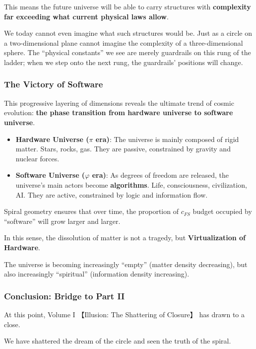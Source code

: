 This means the future universe will be able to carry structures with \textbf{complexity far exceeding what current physical laws allow}.

We today cannot even imagine what such structures would be. Just as a circle on a two-dimensional plane cannot imagine the complexity of a three-dimensional sphere. The ``physical constants'' we see are merely guardrails on this rung of the ladder; when we step onto the next rung, the guardrails' positions will change.

\subsubsection{The Victory of Software}

This progressive layering of dimensions reveals the ultimate trend of cosmic evolution: \textbf{the phase transition from hardware universe to software universe}.

\begin{itemize}
\item \textbf{Hardware Universe ($\pi$ era)}: The universe is mainly composed of rigid matter. Stars, rocks, gas. They are passive, constrained by gravity and nuclear forces.

\item \textbf{Software Universe ($\varphi$ era)}: As degrees of freedom are released, the universe's main actors become \textbf{algorithms}. Life, consciousness, civilization, AI. They are active, constrained by logic and information flow.
\end{itemize}

Spiral geometry ensures that over time, the proportion of $c_{FS}$ budget occupied by ``software'' will grow larger and larger.

In this sense, the dissolution of matter is not a tragedy, but \textbf{Virtualization of Hardware}.

The universe is becoming increasingly ``empty'' (matter density decreasing), but also increasingly ``spiritual'' (information density increasing).

\subsubsection{Conclusion: Bridge to Part II}

At this point, Volume I 【Illusion: The Shattering of Closure】 has drawn to a close.

We have shattered the dream of the circle and seen the truth of the spiral.


